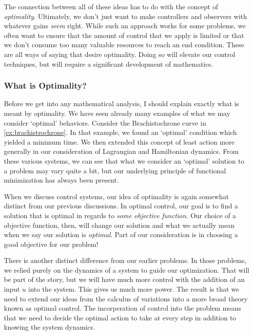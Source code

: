 The connection between all of these ideas has to do with the concept of \textit{optimality}. Ultimately, we don't just want to make controllers and observers with whatever gains \textit{seem} right. While such an approach works for some problems, we often want to ensure that the amount of control that we apply is limited or that we don't consume too many valuable resources to reach an end condition. These are all ways of saying that desire optimality. Doing so will elevate our control techniques, but will require a significant development of mathematics.


\subsubsection{What is Optimality?}
Before we get into any mathematical analysis, I should explain exactly what is meant by optimality. We have seen already many examples of what we may consider `optimal' behaviors. Consider the Brachistochrone curve in \autoref{ex:brachistrochrone}. In that example, we found an `optimal' condition which yielded a minimum time. We then extended this concept of least action more generally in our consideration of Lagrangian and Hamiltonian dynamics. From these various systems, we can see that what we consider an `optimal' solution to a problem may vary quite a bit, but our underlying principle of functional minimization has always been present.

When we discuss control systems, our idea of optimality is again somewhat distinct from our previous discussions. In optimal control, our goal is to find a solution that is optimal in regards to \textit{some objective function}. Our choice of a objective function, then, will change our solution and what we actually mean when we say our solution is \textit{optimal}. Part of our consideration is in choosing a good objective for our problem!

There is another distinct difference from our earlier problems. In those problems, we relied purely on the dynamics of a system to guide our optimization. That will be part of the story, but we will have much more control with the addition of an input $u$ into the system. This gives us much more power. The result is that we need to extend our ideas from the calculus of variations into a more broad theory known as optimal control. The incorperation of control into the problem means that we need to decide the optimal action to take at every step in addition to knowing the system dynamics.

